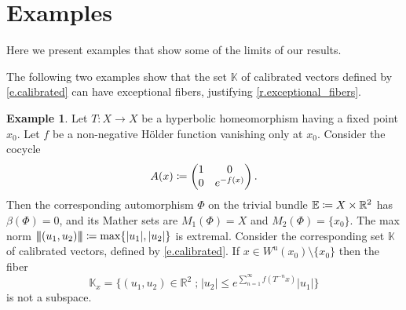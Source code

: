 \documentclass[10pt]{amsart}
\def\vcentcolon{\mathrel{\mathop\ordinarycolon}}
\providecommand\ordinarycolon{:}
\providecommand*\coloneqq{\vcentcolon\mathrel{\mkern-1.2mu}=}
\theoremstyle{plain}
\theoremstyle{definition}
\newtheorem{example}[theorem]{Example}
\newcommand{\tribar}[1]{\mathopen{| {\kern -1.5pt} | {\kern -1.5pt} |} {#1}
\mathclose{| {\kern -1.5pt} | {\kern -1.5pt} |}}
\newcommand{\RR}{\mathbb{R}}
\newcommand{\EE}{\mathbb{E}}
\newcommand{\KK}{\mathbb{K}}
\newcommand{\st}{\;\mathord{;}\;}
\newcommand{\uu}{\mathrm{u}}
\begin{document}
\section{Examples}\label{s.examples}

Here we present examples that show some of the limits of our results.

\label{ss.examples_calibrated}

The following two examples show that the set $\KK$ of calibrated vectors defined by \eqref{e.calibrated} can have exceptional fibers, justifying \cref{r.exceptional_fibers}.

\begin{example}\label{ex.non_space}
Let $T \colon X \to X$ be a hyperbolic homeomorphism having a fixed point $x_0$.
Let $f$ be a non-negative Hölder function vanishing only at $x_0$.
Consider the cocycle
\[
A(x) \coloneqq \begin{pmatrix} 1 & 0 \\ 0 & e^{-f(x)} \end{pmatrix}.
\]
Then the corresponding automorphism $\Phi$ on the trivial bundle $\EE \coloneqq X \times \RR^2$ has $\beta(\Phi) = 0$, and its Mather sets are $M_1(\Phi) = X$ and $M_2(\Phi) = \{x_0\}$.
The max norm $\tribar{(u_1,u_2)} \coloneqq \max \{|u_1|,|u_2|\}$ is extremal.
Consider the corresponding set $\KK$ of calibrated vectors, defined by \eqref{e.calibrated}.
If $x \in W^\uu(x_0) \setminus \{x_0\}$ then the fiber
\[
\KK_x = \big\{ (u_1,u_2) \in \RR^2 \st |u_2| \le e^{\sum_{n=1}^\infty f(T^{-n} x)} |u_1| \big\}
\]
is not a subspace.
\end{example}
\end{document}
